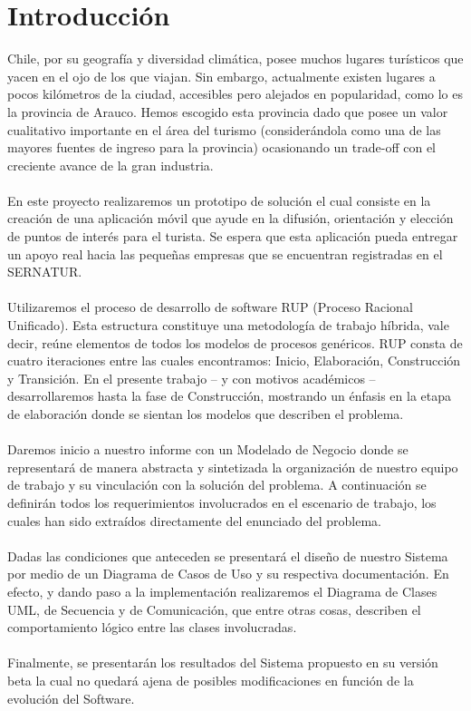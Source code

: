 \documentclass[12pt]{article}
\begin{document}
\section{Introducción}
Chile, por su geografía y diversidad climática, posee muchos lugares turísticos que yacen en el ojo de los que viajan. Sin embargo, actualmente existen lugares a pocos kilómetros de la ciudad, accesibles pero alejados en popularidad, como lo es la provincia de Arauco. Hemos escogido esta provincia dado que posee un valor cualitativo importante en el área del turismo (considerándola como una de las mayores fuentes de ingreso para la provincia) ocasionando un trade-off con el creciente avance de la gran industria.\\\\En este proyecto realizaremos un prototipo de solución el cual consiste en la creación de una aplicación móvil que ayude en la difusión, orientación y elección de puntos de interés para el turista. Se espera que esta aplicación pueda entregar un apoyo real hacia las pequeñas empresas que se encuentran registradas en el SERNATUR.\\\\Utilizaremos el proceso de desarrollo de software RUP (Proceso Racional Unificado). Esta estructura constituye una metodología de trabajo híbrida, vale decir, reúne elementos de todos los modelos de procesos genéricos. RUP consta de cuatro iteraciones entre las cuales encontramos: Inicio, Elaboración, Construcción y Transición. En el presente trabajo – y con motivos académicos – desarrollaremos hasta la fase de Construcción, mostrando un énfasis en la etapa de elaboración donde se sientan los modelos que describen el problema.\\\\Daremos inicio a nuestro informe con un Modelado de Negocio donde se representará de manera abstracta y sintetizada la organización de nuestro equipo de trabajo y su vinculación con la solución del problema. A continuación se definirán todos los requerimientos involucrados en el escenario de trabajo, los cuales han sido extraídos directamente del enunciado del problema.\\\\Dadas las condiciones que anteceden se presentará el diseño de nuestro Sistema por medio de un Diagrama de Casos de Uso y su respectiva documentación. En efecto, y dando paso a la implementación realizaremos el Diagrama de Clases UML, de Secuencia y de Comunicación, que entre otras cosas, describen el comportamiento lógico entre las clases involucradas.\\\\Finalmente, se presentarán los resultados del Sistema propuesto en su versión beta la cual no quedará ajena de posibles modificaciones en función de la evolución del Software. 
\newpage
\end{document}
